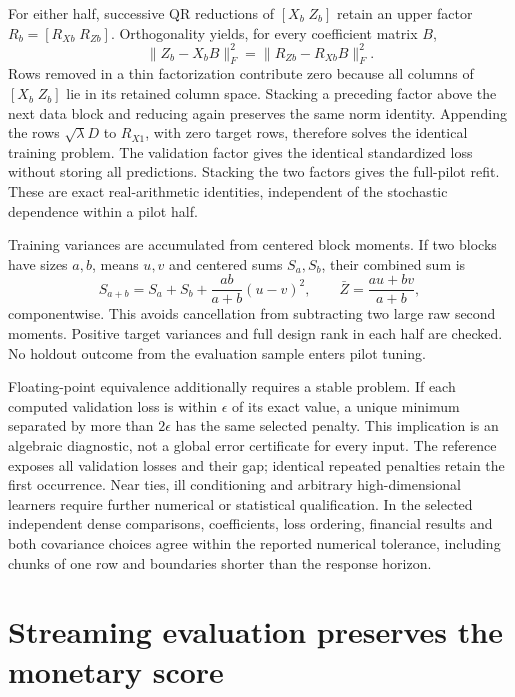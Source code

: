 For either half, successive QR reductions of $[X_b\;Z_b]$ retain an upper
factor $R_b=[R_{Xb}\;R_{Zb}]$. Orthogonality yields, for every coefficient
matrix $B$,
\begin{equation}
 \|Z_b-X_bB\|_F^2=\|R_{Zb}-R_{Xb}B\|_F^2.
 \label{eq:v10:qr-loss}
\end{equation}
Rows removed in a thin factorization contribute zero because all columns of
$[X_b\;Z_b]$ lie in its retained column space. Stacking a preceding factor
above the next data block and reducing again preserves the same norm identity.
Appending the rows $\sqrt\lambda D$ to $R_{X1}$, with zero target rows,
therefore solves the identical training problem. The validation factor gives
the identical standardized loss without storing all predictions. Stacking the
two factors gives the full-pilot refit. These are exact real-arithmetic
identities, independent of the stochastic dependence within a pilot half.

Training variances are accumulated from centered block moments. If two blocks
have sizes $a,b$, means $u,v$ and centered sums $S_a,S_b$, their combined sum is
\begin{equation}
 S_{a+b}=S_a+S_b+\frac{ab}{a+b}(u-v)^2,
 \qquad \bar Z=\frac{au+bv}{a+b},
\end{equation}
componentwise. This avoids cancellation from subtracting two large raw second
moments. Positive target variances and full design rank in each half are checked.
No holdout outcome from the evaluation sample enters pilot tuning.

Floating-point equivalence additionally requires a stable problem. If each
computed validation loss is within $\epsilon$ of its exact value, a unique
minimum separated by more than $2\epsilon$ has the same selected penalty.
This implication is an algebraic diagnostic, not a global error certificate
for every input. The reference exposes all validation losses and their gap;
identical repeated penalties retain the first occurrence. Near ties, ill
conditioning and arbitrary high-dimensional learners require further numerical
or statistical qualification. In the selected independent dense comparisons,
coefficients, loss ordering, financial results and both covariance choices agree
within the reported numerical tolerance, including chunks of one row and
boundaries shorter than the response horizon.

\section{Streaming evaluation preserves the monetary score}
\label{v10:execution}

